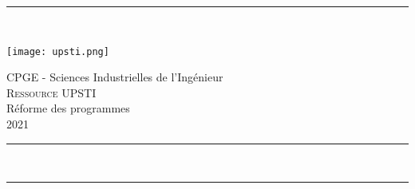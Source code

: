 %
%


\begin{titlepage}	%

  \begin{center} %

% 
% 
%     
% 


 \noindent\rule{\linewidth}{0.5mm}\\[0.4cm]
\noindent\begin{minipage}{0.15\linewidth}
 \texttt{[image: upsti.png]}
\end{minipage}
\noindent\begin{minipage}{0.6\linewidth}
\begin{center}
CPGE - Sciences Industrielles de l'Ingénieur\\[0.4cm]
{ \huge \textsc{Ressource UPSTI} }\\[0.4cm]
{ \huge Réforme des programmes }\\[0.4cm]
{ \huge 2021 }\\[0.4cm]
\end{center}
\end{minipage}
 \noindent\begin{minipage}{0.15\linewidth}
\type
\end{minipage}
\noindent\rule{\linewidth}{0.1mm}\\[0.1cm]
{\large \titre}
\begin{flushright}
\version
\end{flushright} 
\noindent\rule{\linewidth}{0.5mm}\\[0.5cm]
    


\end{center}
\end{titlepage}
